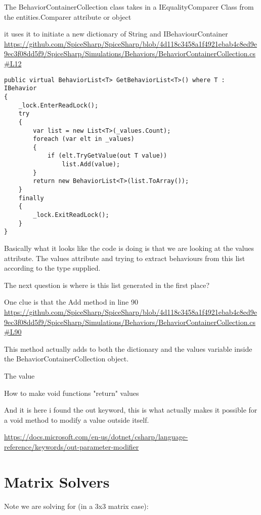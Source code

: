 \documentclass[12pt]{article}
\renewcommand{\_}{\kern-1.5pt\textunderscore\kern-1.5pt}
\begin{document}
The BehaviorContainerCollection class takes in a IEqualityComparer Class from the 
entities.Comparer attribute or object

it uses it to initiate a new dictionary of String and IBehaviourContainer
\url{https://github.com/SpiceSharp/SpiceSharp/blob/4d118c3458a1f4921ebab4c8ed9e9ec3f08dd5f9/SpiceSharp/Simulations/Behaviors/BehaviorContainerCollection.cs#L12}

\begin{verbatim}
public virtual BehaviorList<T> GetBehaviorList<T>() where T : IBehavior
{
	_lock.EnterReadLock();
	try
	{
		var list = new List<T>(_values.Count);
		foreach (var elt in _values)
		{
			if (elt.TryGetValue(out T value))
				list.Add(value);
		}
		return new BehaviorList<T>(list.ToArray());
	}
	finally
	{
		_lock.ExitReadLock();
	}
}
\end{verbatim}


Basically what it looks like the code is doing is that we are looking at the \_values attribute.
The \_values attribute and trying to extract behaviours from this list according to the 
type supplied.

The next question is where is this list generated in the first place?

One clue is that the Add method in line 90
\url{https://github.com/SpiceSharp/SpiceSharp/blob/4d118c3458a1f4921ebab4c8ed9e9ec3f08dd5f9/SpiceSharp/Simulations/Behaviors/BehaviorContainerCollection.cs#L90}

This method actually adds to both the dictionary and the \_values variable inside the BehaviorContainerCollection object.

The value 
\subparagraph[Void functions can return change values of referenced variables using the out keyword]{How to make void functions "return" values}
And it is here i found the out keyword, this is what actually makes it possible
for a void method to modify a value outside itself.

\url{https://docs.microsoft.com/en-us/dotnet/csharp/language-reference/keywords/out-parameter-modifier}


\part{Matrix Solvers}
Note we are solving for (in a 3x3 matrix case):
\end{document}
